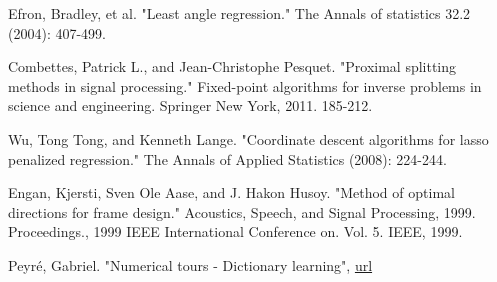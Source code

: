 \documentclass[a4paper,11pt]{article}
\begin{document}
\begin{thebibliography}{9}
Efron, Bradley, et al. "Least angle regression." The Annals of statistics 32.2 (2004): 407-499.

Combettes, Patrick L., and Jean-Christophe Pesquet. "Proximal splitting methods in signal processing." Fixed-point algorithms for inverse problems in science and engineering. Springer New York, 2011. 185-212.

Wu, Tong Tong, and Kenneth Lange. "Coordinate descent algorithms for lasso penalized regression." The Annals of Applied Statistics (2008): 224-244.

Engan, Kjersti, Sven Ole Aase, and J. Hakon Husoy. "Method of optimal directions for frame design." Acoustics, Speech, and Signal Processing, 1999. Proceedings., 1999 IEEE International Conference on. Vol. 5. IEEE, 1999.

Peyré, Gabriel. "Numerical tours - Dictionary learning",
\href{https://github.com/gpeyre/numerical-tours/blob/master/matlab/sparsity_4_dictionary_learning.ipynb}{url}

\end{thebibliography}
\end{document}
